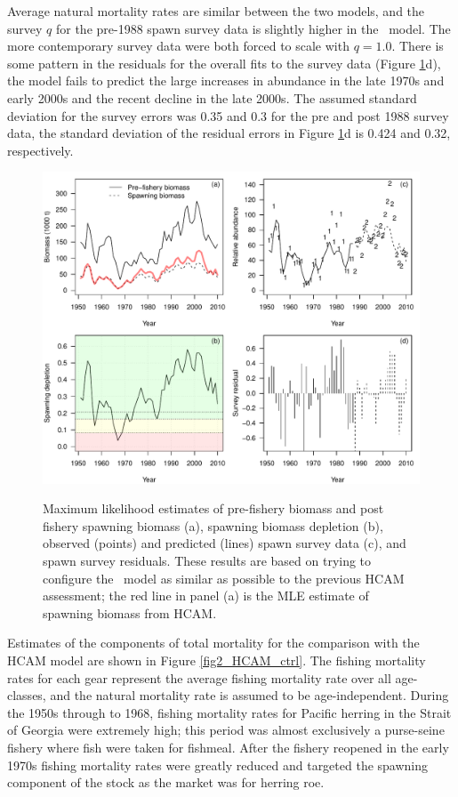 
Average natural mortality rates are similar between the two models, and the survey $q$ for the pre-1988 spawn survey data is slightly higher in the \iscam\ model.  The more contemporary survey data were both forced to scale with $q=1.0$.  There is some pattern in the residuals for the overall fits to the survey data (Figure \ref{fig1_HCAM_ctrl}d), the model fails to predict the large increases in abundance in the late 1970s and early 2000s and the recent decline in the late 2000s.  The assumed standard deviation for the survey errors was 0.35 and 0.3 for the pre and post 1988 survey data, the standard deviation of the residual errors in Figure \ref{fig1_HCAM_ctrl}d is 0.424 and 0.32, respectively.
	
\begin{figure}[!tbp]
	\includegraphics[width=\textwidth]{../Figs/fig1_HCAM_ctrl.pdf}\\
	\caption{Maximum likelihood estimates of pre-fishery biomass and post fishery spawning biomass (a), spawning biomass depletion (b), observed (points) and predicted (lines) spawn survey data (c), and spawn survey residuals.  These results are based on trying to configure the \iscam\ model as similar as possible to the previous HCAM assessment; the red line in panel (a) is the MLE estimate of spawning biomass from HCAM.}\label{fig1_HCAM_ctrl}
\end{figure}


Estimates of the components of total mortality for the comparison with the HCAM model are shown in Figure \ref{fig2_HCAM_ctrl}.  The fishing mortality rates for each gear represent the average fishing mortality rate over all age-classes, and the natural mortality rate is assumed to be age-independent.  During the 1950s through to 1968, fishing mortality rates for Pacific herring in the Strait of Georgia were extremely high; this period was almost exclusively a purse-seine fishery where fish were taken for fishmeal.  After the fishery reopened in the early 1970s fishing mortality rates were greatly reduced and targeted the spawning component of the stock as the market was for herring roe. 

